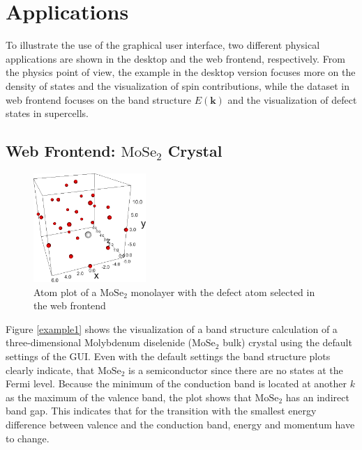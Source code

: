 \chapter{Applications}
\label{chap:applications}


To illustrate the use of the graphical user interface, two different physical
applications are shown in the desktop and the web frontend, respectively. From
the physics point of view, the example in the desktop version focuses more on the
density of states and the visualization of spin contributions, while the dataset
in web frontend focuses on the band structure $E(\mathbf{k})$ and the visualization
of defect states in supercells.

\section{Web Frontend: $\textrm{MoSe}_2$ Crystal}
\label{appl_frontend}

\begin{figure} %
    \centering
    \includegraphics[width=0.38\textwidth]{img/gui_web_mose2_monolayer_atomplot.png}
    \caption[Atom Plot of a $\textrm{MoSe}_2$ monolayer]{Atom plot of a $\textrm{MoSe}_2$ monolayer with the defect atom selected in
      the web frontend}
    \label{fig:modules}
\end{figure}

Figure \ref{example1} shows the visualization of a band structure calculation of a three-dimensional Molybdenum diselenide ($\textrm{MoSe}_2$ bulk) crystal using the default settings of the GUI. Even with the default settings the band structure plots clearly indicate, that $\textrm{MoSe}_2$ is a semiconductor since there are no states at the Fermi level. Because the minimum of the conduction band is located at another $k$ as the maximum of the valence band, the plot shows that $\textrm{MoSe}_2$ has an indirect band gap. This indicates that for the transition with the smallest energy difference between valence and the conduction band, energy and momentum have to change.

